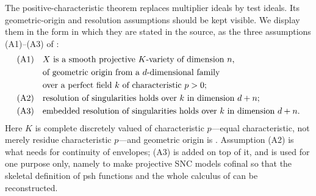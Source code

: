 The positive-characteristic theorem replaces multiplier ideals by test
ideals.  Its geometric-origin and resolution assumptions should be kept
visible.  We display them in the form in which they are stated in the
source, as the three assumptions \textup{(A1)}--\textup{(A3)} of
\cite[\S9]{GJKM19}:
\begin{equation}
\label{eq:ch29-gjkm-assumptions}
\begin{aligned}
 \textup{(A1)}\quad&\text{$X$ is a smooth projective $K$-variety of
   dimension $n$,}\\
 &\text{of geometric origin from a $d$-dimensional family}\\
 &\text{over a perfect field $k$ of characteristic $p>0$; }\\
 \textup{(A2)}\quad&\text{resolution of singularities holds over $k$ in
   dimension $d+n$;}\\
 \textup{(A3)}\quad&\text{embedded resolution of singularities holds over
   $k$ in dimension $d+n$.}
\end{aligned}
\end{equation}
Here $K$ is complete discretely valued of characteristic $p$---equal
characteristic, not merely residue characteristic $p$---and geometric
origin is .  Assumption \textup{(A2)} is
what  needs for continuity of
envelopes; \textup{(A3)} is added on top of it, and is used for one purpose
only, namely to make projective SNC models cofinal so that the skeletal
definition of psh functions and the whole calculus of
 can be
reconstructed.

